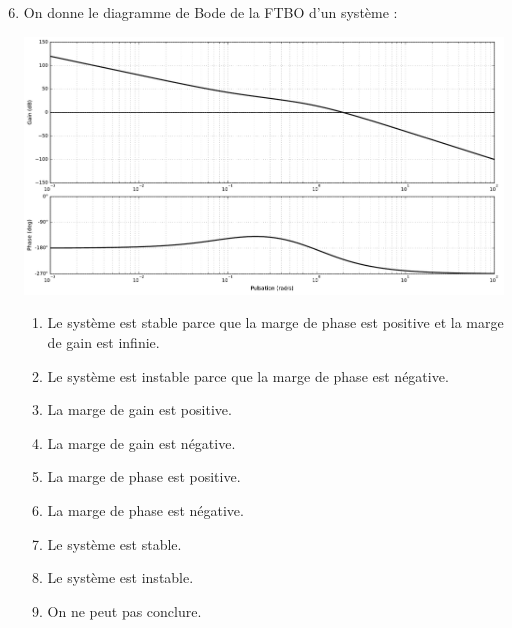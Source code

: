 \documentclass[10pt,fleqn]{article} %
\begin{document}
\begin{multicols}{2}
\begin{enumerate}
\setcounter{enumi}{5}
\item On donne le diagramme de Bode de la FTBO d'un système : 
\begin{center}
\includegraphics[width=\linewidth]{images/img_02}
\end{center}
\begin{enumerate}
\item Le système est stable parce que la marge de phase est positive et la marge de gain est infinie.
\item Le système est instable parce que la marge de phase est négative.
\item La marge de gain est positive. %
\item La marge de gain est négative. %
\item La marge de phase est positive.
\item La marge de phase est négative.
\item Le système est stable.
\item Le système est instable. %
\item On ne peut pas conclure. %
\end{enumerate}
\end{enumerate}


\end{multicols}
\end{document}
